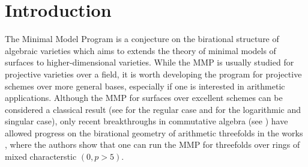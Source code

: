 %
%
%
%
%
%
%
%
%
%
%
%

	
	\section{Introduction}
	
	The Minimal Model Program is a conjecture on the birational structure of algebraic varieties which aims to extends the theory of minimal models of surfaces to higher-dimensional varieties.
	While the MMP is usually studied for projective varieties over a field, it is worth developing the program for projective schemes over more general bases, especially if one is interested in arithmetic applications. 
	Although the MMP for surfaces over excellent schemes can be considered a classical result (see \cite{Sha66} for the regular case and \cite{Tan18} for the logarithmic and singular case), only recent breakthroughs in commutative algebra (see \cite{bhatt2020cohenmacaulayness}) have allowed progress on the birational geometry of arithmetic threefolds in the works \cite{takamatsu2021minimal,bhatt2020}, where the authors show that one can run the MMP for threefolds over rings of mixed characterstic $(0, p>5)$. 
	
